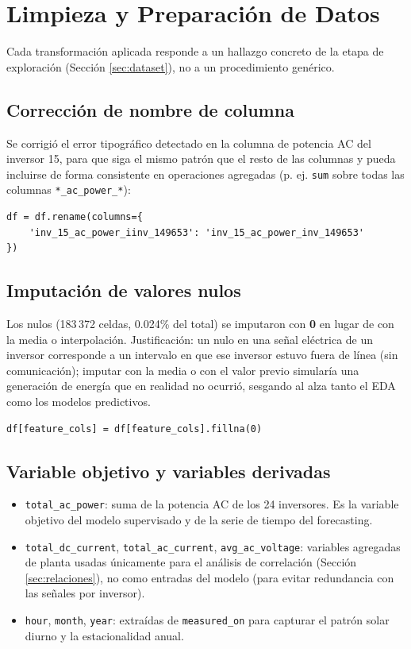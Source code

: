 \section{Limpieza y Preparación de Datos}

Cada transformación aplicada responde a un hallazgo concreto de la etapa de exploración (Sección \ref{sec:dataset}), no a un procedimiento genérico.

\subsection*{Corrección de nombre de columna}

Se corrigió el error tipográfico detectado en la columna de potencia AC del inversor 15, para que siga el mismo patrón que el resto de las columnas y pueda incluirse de forma consistente en operaciones agregadas (p. ej. \texttt{sum} sobre todas las columnas \texttt{*\_ac\_power\_*}):

\begin{verbatim}
df = df.rename(columns={
    'inv_15_ac_power_iinv_149653': 'inv_15_ac_power_inv_149653'
})
\end{verbatim}

\subsection*{Imputación de valores nulos}

Los nulos (183\,372 celdas, 0.024\% del total) se imputaron con \textbf{0} en lugar de con la media o interpolación. Justificación: un nulo en una señal eléctrica de un inversor corresponde a un intervalo en que ese inversor estuvo fuera de línea (sin comunicación); imputar con la media o con el valor previo simularía una generación de energía que en realidad no ocurrió, sesgando al alza tanto el EDA como los modelos predictivos.

\begin{verbatim}
df[feature_cols] = df[feature_cols].fillna(0)
\end{verbatim}

\subsection*{Variable objetivo y variables derivadas}

\begin{itemize}
    \item \texttt{total\_ac\_power}: suma de la potencia AC de los 24 inversores. Es la variable objetivo del modelo supervisado y de la serie de tiempo del forecasting.
    \item \texttt{total\_dc\_current}, \texttt{total\_ac\_current}, \texttt{avg\_ac\_voltage}: variables agregadas de planta usadas únicamente para el análisis de correlación (Sección \ref{sec:relaciones}), no como entradas del modelo (para evitar redundancia con las señales por inversor).
    \item \texttt{hour}, \texttt{month}, \texttt{year}: extraídas de \texttt{measured\_on} para capturar el patrón solar diurno y la estacionalidad anual.
\end{itemize}

